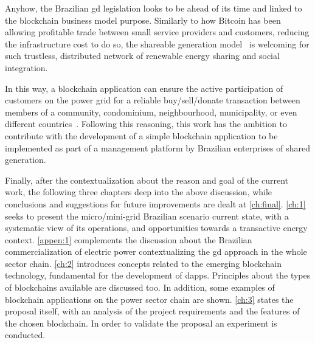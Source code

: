 Anyhow, the Brazilian \gls{gd} legislation looks to be ahead of its time and linked to the blockchain business model purpose.
Similarly to how Bitcoin has been allowing profitable trade between small service providers and customers, reducing the infrastructure cost to do so,
the shareable generation model~\cite{GD} is welcoming for such trustless, distributed network of renewable energy sharing and social integration.

In this way, a blockchain application can ensure the active participation of customers on the power grid for a reliable buy/sell/donate transaction between members of a community, condominium, neighbourhood, municipality, or even different countries~\cite{Coelho2016}.
Following this reasoning, this work has the ambition to contribute with the development of a simple  blockchain application to be implemented as part of a management platform by Brazilian enterprises of shared generation.

Finally, after the contextualization about the reason and goal of the current work,
the following three chapters deep into the above discussion,
while conclusions and suggestions for future improvements are dealt at \autoref{ch:final}.
\autoref{ch:1} seeks to present the micro/mini-grid Brazilian scenario current state, with a systematic view of its operations, and opportunities towards a transactive energy context.
\autoref{appen:1} complements the discussion about the Brazilian commercialization of electric power contextualizing the \gls{gd} approach in the whole sector chain.
\autoref{ch:2} introduces concepts related to the emerging blockchain technology, fundamental for the development of \glspl{dapp}.
Principles about the types of blockchains available are discussed too.
In addition, some examples of blockchain applications on the power sector chain are shown.
\autoref{ch:3} states the proposal itself, with an analysis of the project requirements and the features of the chosen blockchain.
In order to validate the proposal an experiment is conducted.